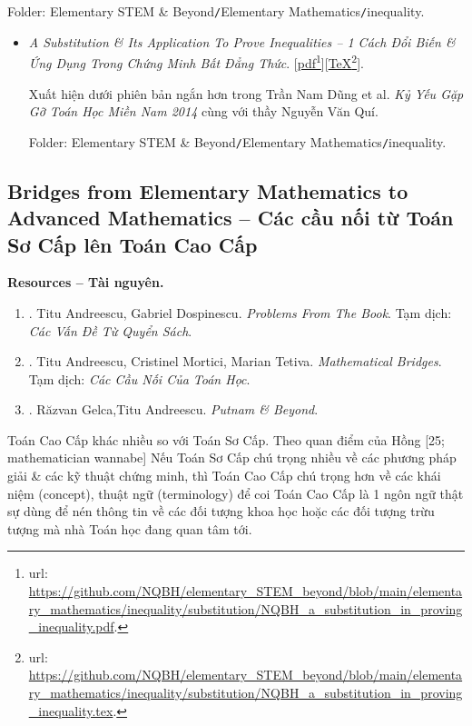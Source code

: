 \documentclass[12pt,oneside]{book}
\begin{document}
\begin{enumerate}
	Folder: {\sf Elementary STEM \& Beyond{\tt/}Elementary Mathematics{\tt/}inequality}.
	\begin{itemize}
		\item {\it A Substitution \& Its Application To Prove Inequalities -- 1 Cách Đổi Biến \& Ứng Dụng Trong Chứng Minh Bất Đẳng Thức}. [\href{https://github.com/NQBH/elementary_STEM_beyond/blob/main/elementary_mathematics/inequality/substitution/NQBH_a_substitution_in_proving_inequality.pdf}{pdf}\footnote{{\sc url}: \url{https://github.com/NQBH/elementary_STEM_beyond/blob/main/elementary_mathematics/inequality/substitution/NQBH_a_substitution_in_proving_inequality.pdf}.}][\href{https://github.com/NQBH/elementary_STEM_beyond/blob/main/elementary_mathematics/inequality/substitution/NQBH_a_substitution_in_proving_inequality.tex}{\TeX}\footnote{{\sc url}: \url{https://github.com/NQBH/elementary_STEM_beyond/blob/main/elementary_mathematics/inequality/substitution/NQBH_a_substitution_in_proving_inequality.tex}.}].
		
		Xuất hiện dưới phiên bản ngắn hơn trong {\sc Trần Nam Dũng} et al. {\it Kỷ Yếu Gặp Gỡ Toán Học Miền Nam 2014} cùng với thầy {\sc Nguyễn Văn Quí}.
		
		Folder: {\sf Elementary STEM \& Beyond{\tt/}Elementary Mathematics{\tt/}inequality}.
	\end{itemize}
\end{enumerate}

\subsection{Bridges from Elementary Mathematics to Advanced Mathematics -- Các cầu nối từ Toán Sơ Cấp lên Toán Cao Cấp}
{\bf \textsf{Resources -- Tài nguyên.}}
\begin{enumerate}
	\item \cite{Andreescu_Dospinescu2010}. {\sc Titu Andreescu, Gabriel Dospinescu}. {\it Problems From The Book}. {\sf Tạm dịch}: {\it Các Vấn Đề Từ Quyển Sách}.
	\item \cite{Andreescu_Mortici_Tetiva2017}. {\sc Titu Andreescu, Cristinel Mortici, Marian Tetiva}. {\it Mathematical Bridges}. {\sf Tạm dịch}: {\it Các Cầu Nối Của Toán Học}.
	\item \cite{Gelca_Andreescu2017}. {\sc R\u{a}zvan Gelca,Titu Andreescu}. {\it Putnam \& Beyond}.
\end{enumerate}
Toán Cao Cấp khác nhiều so với Toán Sơ Cấp. Theo quan điểm của {\sf Hồng [25; mathematician wannabe]} Nếu Toán Sơ Cấp chú trọng nhiều về các phương pháp giải \& các kỹ thuật chứng minh, thì Toán Cao Cấp chú trọng hơn về các khái niệm (concept), thuật ngữ (terminology) để coi Toán Cao Cấp là 1 ngôn ngữ thật sự dùng để nén thông tin về các đối tượng khoa học hoặc các đối tượng trừu tượng mà nhà Toán học đang quan tâm tới.
\end{document}
